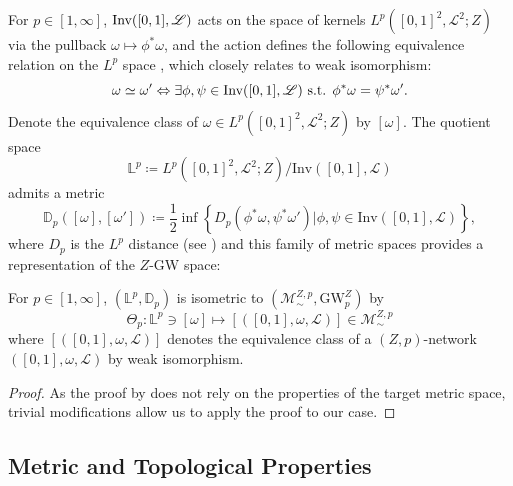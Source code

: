 \documentclass[twoside,11pt]{article}
\theoremstyle{definition}
\newcommand{\M}{\mathcal{M}}
\newcommand{\MZp}{\M_{\sim}^{Z,p}}
\newcommand{\dgwz}{\mathrm{GW}_p^Z}
\begin{document}
For $p\in [1,\infty]$, $\textnormal{Inv}([0,1],\mathscr{L})$ acts on the space of kernels $L^p([0,1]^2, \mathscr{L}^2;Z)$ via the pullback $\omega \mapsto \phi^* \omega$, and the action defines the following equivalence relation on the $L^p$ space , which closely relates to weak isomorphism:
\begin{equation}
    \omega \simeq \omega' \Leftrightarrow \exists \phi, \psi\in\textnormal{Inv}([0,1],\mathscr{L}) \textrm{ s.t. }\phi^*\omega=  \psi^*\omega'.
\end{equation}
Denote the equivalence class of $\omega \in L^p([0,1]^2, \mathscr{L}^2;Z)$ by $[\omega]$. The quotient space 
\[
\mathbb{L}^p \coloneqq L^p([0,1]^2, \mathscr{L}^2;Z)/\textrm{Inv}([0,1], \mathscr{L})
\]
admits a metric
\begin{equation}
    \mathbb{D}_p([\omega], [\omega']) \coloneqq \frac{1}{2}\inf\left\{D_p(\phi^* \omega, \psi^* \omega')|\phi,\psi \in \textrm{Inv}([0,1], \mathscr{L})\right\},
\end{equation}
where $D_p$ is the $L^p$ distance (see ) and this family of metric spaces provides a representation of the $Z$-GW space:
\begin{theorem}
    \label{thm:quotient_rep_Lp}
    For $p\in [1,\infty]$, $(\mathbb{L}^p, \mathbb{D}_p)$ is isometric to $(\MZp, \dgwz)$ by 
    \begin{equation}
    \Theta_p: \mathbb{L}^p\ni [\omega] \mapsto [([0,1],\omega, \mathscr{L})] \in \MZp
    \end{equation}
    where $[([0,1],\omega, \mathscr{L})]$ denotes the equivalence class of a $(Z,p)$-network $([0,1],\omega, \mathscr{L})$ by weak isomorphism.
\end{theorem}
\begin{proof}
    As the proof by \citet[Theorem 5.10]{sturm2023space} does not rely on the properties of the target metric space, trivial modifications allow us to apply the proof to our case.
\end{proof}

\subsection{Metric and Topological Properties}
\end{document}
